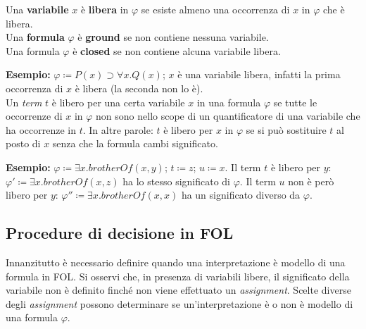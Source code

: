 Una \textbf{variabile} $x$ è \textbf{libera} in $\varphi$ se esiste almeno una occorrenza di $x$ in $\varphi$ che è libera.
\\

Una \textbf{formula} $\varphi$ è \textbf{ground} se non contiene nessuna variabile.
\\

Una formula $\varphi$ è \textbf{closed} se non contiene alcuna variabile libera.

\textbf{Esempio: } $\varphi \coloneqq P(x) \supset \forall x. Q(x)$; $x$ è una variabile libera, infatti la prima occorrenza di $x$ è libera (la seconda non lo è).
\\

Un \textit{term} $t$ è libero per una certa variabile $x$ in una formula $\varphi$ se tutte le occorrenze di $x$ in $\varphi$ non sono nello scope di un quantificatore di una variabile che ha occorrenze in $t$. In altre parole: $t$ è libero per $x$ in $\varphi$ se si può sostituire $t$ al posto di $x$ senza che la formula cambi significato.

\textbf{Esempio: } $\varphi \coloneqq \exists x. brotherOf(x, y)$; $t \coloneqq z$; $u \coloneqq x$. Il term $t$ è libero per $y$: $\varphi' \coloneqq \exists x. brotherOf(x, z)$ ha lo stesso significato di $\varphi$. Il term $u$ non è però libero per $y$: $\varphi'' \coloneqq \exists x. brotherOf(x, x)$ ha un significato diverso da $\varphi$.

\subsection{Procedure di decisione in FOL}
Innanzitutto è necessario definire quando una interpretazione è modello di una formula in FOL. Si osservi che, in presenza di variabili libere, il significato della variabile non è definito finché non viene effettuato un \textit{assignment}. Scelte diverse degli \textit{assignment} possono determinare se un'interpretazione è o non è modello di una formula $\varphi$.

